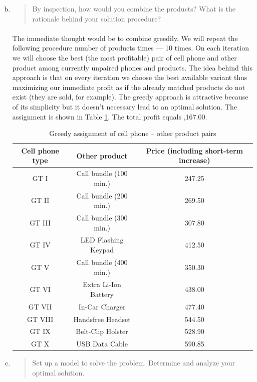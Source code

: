 \begin{enumerate}[(a)]
\setcounter{enumi}{1}
\item\begin{quote}By inspection, how would you combine the products? What is the rationale behind
your solution procedure?\end{quote}

	\paragraph{}
	The immediate thought would be to combine greedily. We will repeat the following procedure number of products times --- 10 times. On each iteration we will choose the best (the most profitable) pair of cell phone and other product among currently unpaired phones and products. The idea behind this approach is that on every iteration we choose the best available variant thus maximizing our immediate profit as if the already matched products do not exist (they are sold, for example). The greedy approach is attractive because of its simplicity but it doesn't necessary lead to an optimal solution. The assignment is shown in Table \ref{greedy-5-b}. The total profit equals ,167.00.

\begin{table}[H]
	\centering
	\caption{Greedy assignment of cell phone -- other product pairs}
	\begin{tabular}{|c|c|c|}\hline
Cell phone type & Other product & Price (including short-term increase) \\ \hline
GT I & Call bundle (100 min.) & 247.25 \\
GT II & Call bundle (200 min.) & 269.50 \\
GT III & Call bundle (300 min.) & 307.80 \\
GT IV & LED Flashing Keypad & 412.50 \\
GT V & Call bundle (400 min.) & 350.30 \\
GT VI & Extra Li-Ion Battery & 438.00 \\
GT VII & In-Car Charger & 477.40 \\
GT VIII & Handsfree Headset & 544.50 \\
GT IX & Belt-Clip Holster & 528.90 \\
GT X & USB Data Cable & 590.85 \\
\hline
	\end{tabular}
	\label{greedy-5-b}
\end{table}

\item\begin{quote}Set up a model to solve the problem. Determine and analyze your optimal solution.\end{quote}


\end{enumerate}
